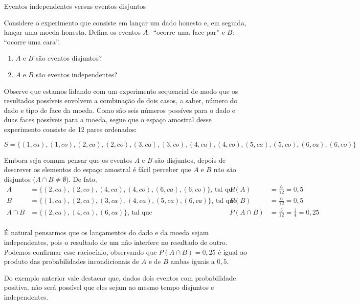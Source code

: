 \begin{example}{Eventos independentes versus eventos disjuntos}

Considere o experimento que consiste em lançar um dado honesto e, em seguida, lançar uma moeda honesta. Defina os eventos \(A:\) “ocorre uma face par”{} e \(B:\) “ocorre uma cara”.
\begin{enumerate}
\item {} 
\(A\) e \(B\) são eventos disjuntos?

\item {} 
\(A\) e \(B\) são eventos independentes?

\end{enumerate}

Observe que estamos lidando com um experimento sequencial de modo que os resultados possíveis envolvem a combinação de dois casos, a saber, número do dado e tipo de face da moeda. Como são seis números possíves para o dado e duas faces possíveis para a moeda, segue que o espaço amostral desse experimento consiste de 12 pares ordenados:

\(S=\{(1,ca),(1,co),(2,ca),(2,co),(3,ca),(3,co),(4,ca),(4,co),(5,ca),(5,co),(6,ca),(6,co)\}\)

Embora seja comum pensar que os eventos \(A\) e \(B\) são disjuntos, depois de descrever os elementos do espaço amostral é fácil perceber que $A$ e  $B$ não são disjuntos (\(A\cap B\neq \emptyset\)). De fato,
\begin{align*}
A&=\{(2,ca),(2,co),(4,ca),(4,co),(6,ca),(6,co)\}\text{, tal que } &P(A)&=\frac{6}{12}=0{,}5\\
B&=\{(1,ca),(2,ca),(3,ca),(4,ca),(5,ca),(6,ca)\} \text{, tal que } &P(B)&=\frac{6}{12}=0{,}5\\
A\cap B&=\{(2,ca),(4,ca),(6,ca)\} \text{, tal que }&P(A\cap B)&=\frac{3}{12}=\frac{1}{4}=0{,}25\\
\end{align*}

É natural pensarmos que os lançamentos do dado e da moeda sejam independentes, pois o resultado de um não interfere no resultado de outro. Podemos confirmar esse raciocínio, observando que \(P(A\cap B)=0{,}25\) é igual ao produto das probabilidades incondicionais de \(A\) e de \(B\)  ambas iguais a $0{,}5$.
\end{example}

Do exemplo anterior vale destacar que, dados dois eventos com probabilidade positiva, não será possível que eles sejam ao mesmo tempo disjuntos e independentes.

